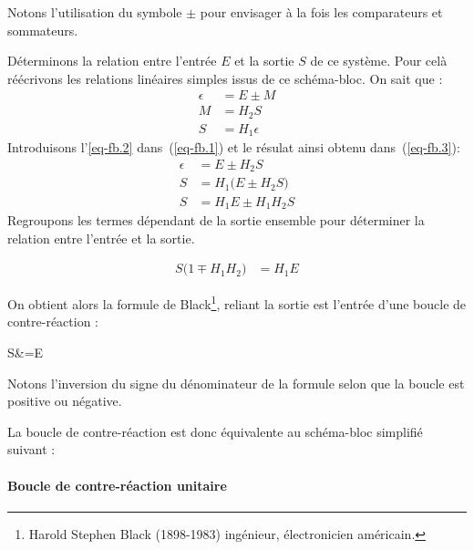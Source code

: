 \begin{center}
    
\end{center}
Notons l'utilisation du symbole $\pm$ pour envisager à la fois les 
comparateurs et sommateurs.

Déterminons la relation entre l'entrée $E$ et la sortie $S$ de ce système.
Pour celà réécrivons les relations linéaires simples issus de ce schéma-bloc.
On sait que :
\begin{align}
    \epsilon&=E\pm M \label{eq-fb.1}\\
    M&=H_2S       \label{eq-fb.2}\\
    S&=H_1\epsilon \label{eq-fb.3}
\end{align}
Introduisons l'\cref{eq-fb.2} dans~(\ref{eq-fb.1}) et le résulat ainsi 
obtenu dans~(\ref{eq-fb.3}):
\begin{align*}
    \epsilon&=E\pm H_2S \\
     S&=H_1\big(E\pm H_2S\big) \\
     S&=H_1E\pm H_1H_2S
\end{align*}
Regroupons les termes dépendant de la sortie ensemble pour déterminer 
la relation entre l'entrée et la sortie.

\begin{align*}
    S\big(1\mp H_1H_2\big)&=H_1E 
\end{align*}

On obtient alors la formule de Black\footnote{
Harold Stephen Black (1898-1983) ingénieur, 
électronicien américain.}, 
reliant la sortie est l'entrée d'une boucle de contre-réaction :
\begin{bequation}
    S&=E
\end{bequation}

Notons l'inversion du signe du dénominateur de la formule 
selon que la boucle est positive ou négative.

La boucle de contre-réaction est donc équivalente au schéma-bloc 
simplifié suivant :
\begin{center}
    
\end{center}


\paragraph{Boucle de contre-réaction unitaire}

